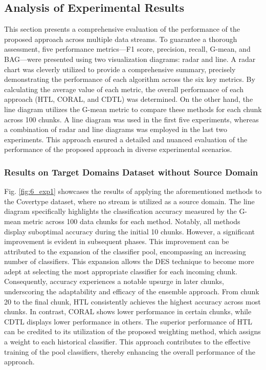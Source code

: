 \subsection{Analysis of Experimental Results}
This section presents a comprehensive evaluation of the performance of the proposed approach across multiple data streams. To guarantee a thorough assessment, five performance metrics—F1 score, precision, recall, G-mean, and BAG—were presented using two visualization diagrams: radar and line. A radar chart was cleverly utilized to provide a comprehensive summary, precisely demonstrating the performance of each algorithm across the six key metrics. By calculating the average value of each metric, the overall performance of each approach (HTL, CORAL, and CDTL) was determined. On the other hand, the line diagram utilizes the G-mean metric to compare these methods for each chunk across 100 chunks. A line diagram was used in the first five experiments, whereas a combination of radar and line diagrams was employed in the last two experiments. This approach ensured a detailed and nuanced evaluation of the performance of the proposed approach in diverse experimental scenarios.

\subsubsection{Results on Target Domains Dataset without Source Domain}
Fig. \ref{fig:6_exp1} showcases the results of applying the aforementioned methods to the Covertype dataset, where no stream is utilized as a source domain. The line diagram specifically highlights the classification accuracy measured by the G-mean metric across 100 data chunks for each method. Notably, all methods display suboptimal accuracy during the initial 10 chunks. However, a significant improvement is evident in subsequent phases. This improvement can be attributed to the expansion of the classifier pool, encompassing an increasing number of classifiers. This expansion allows the DES technique to become more adept at selecting the most appropriate classifier for each incoming chunk. Consequently, accuracy experiences a notable upsurge in later chunks, underscoring the adaptability and efficacy of the ensemble approach. From chunk 20 to the final chunk, HTL consistently achieves the highest accuracy across most chunks. In contrast, CORAL shows lower performance in certain chunks, while CDTL displays lower performance in others. The superior performance of HTL can be credited to its utilization of the proposed weighting method, which assigns a weight to each historical classifier. This approach contributes to the effective training of the pool classifiers, thereby enhancing the overall performance of the approach.

